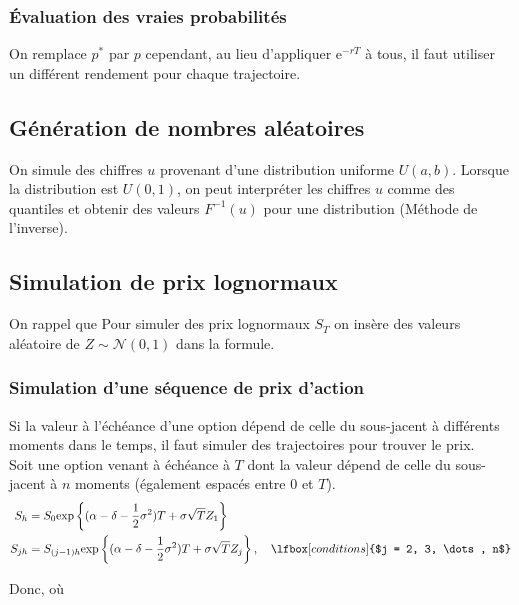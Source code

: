 \documentclass[10pt, french]{article}
\begin{document}
\begin{multicols*}{2}
\subsubsection*{Évaluation des vraies probabilités}
On remplace $p^{*}$ par $p$ cependant, au lieu d'appliquer $\textrm{e}^{-rT}$ à tous, il faut utiliser un différent rendement pour chaque trajectoire.


\columnbreak
\subsection{Génération de nombres aléatoires}
On simule des chiffres $u$ provenant d'une distribution uniforme $U(a, b)$. Lorsque la distribution est $U(0, 1)$, on peut interpréter les chiffres $u$ comme des quantiles et obtenir des valeurs $F^{-1}(u)$ pour une distribution (Méthode de l'inverse).

\subsection{Simulation de prix lognormaux}
On rappel que 
Pour simuler des prix lognormaux $S_{T}$ on insère des valeurs aléatoire de $Z \sim \mathcal{N}(0, 1)$ dans la formule.

\subsubsection*{Simulation d'une séquence de prix d'action}
Si la valeur à l'échéance d'une option dépend de celle du sous-jacent à différents moments dans le temps, il faut simuler des trajectoires pour trouver le prix.\\

Soit une option venant à échéance à $T$ dont la valeur dépend de celle du sous-jacent à $n$ moments (également espacés entre $0$ et $T$). 
\begin{align*}
	S_{h}	
	&=	S_{0}\textrm{exp}\left\{ (\alpha - \delta - \frac{1}{2}\sigma^{2})T + \sigma\sqrt{T} Z_{1} \right\}	\\
	S_{jh}	
	&=	S_{(j - 1)h}\textrm{exp}\left\{ (\alpha - \delta - \frac{1}{2}\sigma^{2})T + \sigma\sqrt{T} Z_{j} \right\},	\quad	\lfbox[conditions]{$j	=	2, 3, \dots, n$}
\end{align*}

Donc,  où 



\end{multicols*}
\end{document}
